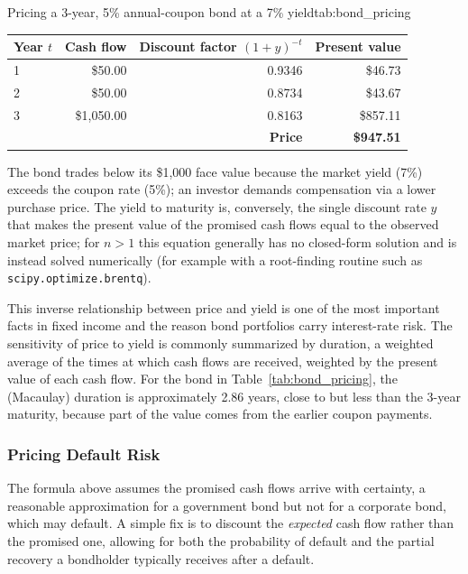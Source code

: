 \documentclass[../ai_in_finance]{subfiles}
\begin{document}
\begin{booktable}[htbp]{Pricing a 3-year, 5\% annual-coupon bond at a 7\% yield}{tab:bond_pricing}
\begin{tabular}{lrrr}
\toprule
Year $t$ & Cash flow & Discount factor $(1+y)^{-t}$ & Present value \\
\midrule
1 & \$50.00   & 0.9346 & \$46.73 \\
2 & \$50.00   & 0.8734 & \$43.67 \\
3 & \$1{,}050.00 & 0.8163 & \$857.11 \\
\midrule
\multicolumn{3}{r}{\textbf{Price}} & \textbf{\$947.51} \\
\bottomrule
\end{tabular}
\end{booktable}

The bond trades below its \$1,000 face value because the market yield (7\%) exceeds the coupon rate (5\%); an investor demands compensation via a lower purchase price. The yield to maturity is, conversely, the single discount rate $y$ that makes the present value of the promised cash flows equal to the observed market price; for $n>1$ this equation generally has no closed-form solution and is instead solved numerically (for example with a root-finding routine such as \texttt{scipy.optimize.brentq}).

This inverse relationship between price and yield is one of the most important facts in fixed income and the reason bond portfolios carry interest-rate risk. The sensitivity of price to yield is commonly summarized by duration, a weighted average of the times at which cash flows are received, weighted by the present value of each cash flow. For the bond in Table~\ref{tab:bond_pricing}, the (Macaulay) duration is approximately 2.86 years, close to but less than the 3-year maturity, because part of the value comes from the earlier coupon payments.

\subsubsection*{Pricing Default Risk}

The formula above assumes the promised cash flows arrive with certainty, a reasonable approximation for a government bond but not for a corporate bond, which may default. A simple fix is to discount the \emph{expected} cash flow rather than the promised one, allowing for both the probability of default and the partial recovery a bondholder typically receives after a default.
\end{document}
